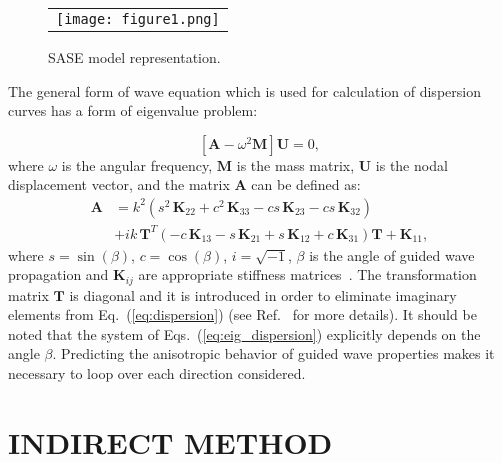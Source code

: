 \documentclass[]{spie}  %
\newcommand{\matr}[1]{\mathbf{#1}} %
\newcommand{\vect}[1]{\mathbf{#1}} %
\begin{document}
\begin{figure} [ht]
	\begin{center}
		\begin{tabular}{c} %
			\texttt{[image: figure1.png]}
		\end{tabular}
	\end{center}
	\caption[] 
	{ \label{fig:layered_composite_SASE} 
		SASE model representation.}
\end{figure} 

The general form of wave equation which is used for calculation of dispersion curves has a form of eigenvalue problem:

\begin{equation}
\left[\matr{A} - \omega^2\matr{M} \right] \vect{U} =0,
\label{eq:eig_dispersion}
\end{equation}
where \(\omega\) is the angular frequency, \(\matr{M}\) is the mass matrix, \(\matr{U}\) is the nodal displacement vector, and the matrix \(\matr{A}\) can be defined as:
\begin{equation}
\begin{aligned}
\matr{A} & =  k^2\left(s^2 \,\matr{K}_{22} + c^2\, \matr{K}_{33} - c s\, \matr{K}_{23} - c s\, \matr{K}_{32}\right) \\
& + i k\, \matr{T}^T\left(-c\, \matr{K}_{13} - s\, \matr{K}_{21} + s\, \matr{K}_{12} + c\, \matr{K}_{31}\right) \matr{T} +\matr{K}_{11},
\end{aligned}
\label{eq:dispersion}
\end{equation}
where  \(s = \sin(\beta)\), \(c = \cos(\beta)\), \(i = \sqrt{-1}\), \(\beta\) is the angle 
of guided wave propagation and \(\matr{K}_{ij}\) are appropriate stiffness matrices~\cite{Taupin2011}. 
The transformation matrix \(\matr{T}\) is diagonal and it is introduced in order to eliminate imaginary elements from Eq.~(\ref{eq:dispersion}) (see Ref.~ for more details). 
It should be noted that the system of Eqs.~(\ref{eq:eig_dispersion}) explicitly depends on the angle \(\beta\). 
Predicting the anisotropic behavior of guided wave properties makes it necessary to loop over each direction considered.

\section{INDIRECT METHOD}
\label{sec:indirect}
\end{document}
